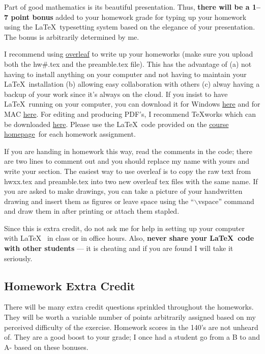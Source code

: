 \documentclass[12pt]{article}
\newcommand{\ingreen}[1]{\color{green}\textbf{#1} \color{black}}
\newcommand{\coursewebpage}{\href{https://github.com/kapelner/QC_Math_390.4_Spring_2020}{course homepage}}
\newcommand{\qu}[1]{``#1''}
\begin{document}
Part of good mathematics is its beautiful presentation. Thus, \ingreen{there will be a 1--7 point bonus} added to your homework grade  for typing up your homework using the \LaTeX ~typesetting system based on the elegance of your presentation. The bonus is arbitrarily determined by me.

I recommend using \href{http://overleaf.com}{overleaf} to write up your homeworks (make sure you upload both the hw\#.tex and the preamble.tex file). This has the advantage of (a) not having to install anything on your computer and not having to maintain your \LaTeX ~installation (b) allowing easy collaboration with others (c) alway having a backup of your work since it's always on the cloud. If you insist to have \LaTeX ~running on your computer, you can download it for Windows \href{http://www.miktex.org/download}{here} and for MAC \href{http://www.tug.org/mactex/}{here}. For editing and producing PDF's, I recommend \TeX works which can be downloaded \href{http://www.tug.org/texworks/#Getting_TeXworks}{here}. Please use the \LaTeX ~code provided on the \coursewebpage ~for each homework assignment. 

If you are handing in homework this way, read the comments in the code; there are two lines to comment out and you should replace my name with yours and write your section. The easiest way to use overleaf is to copy the raw text from hwxx.tex and preamble.tex into two new overleaf tex files with the same name. If you are asked to make drawings, you can take a picture of your handwritten drawing and insert them as figures or leave space using the \qu{$\backslash$vspace} command and draw them in after printing or attach them stapled.

Since this is extra credit, do not ask me for help in setting up your computer with \LaTeX~ in class or in office hours. Also, \textbf{never share your \LaTeX~code with other students} --- it is cheating and if you are found I will take it seriously.

\subsection*{Homework Extra Credit}

There will be many extra credit questions sprinkled throughout the homeworks. They will be worth a variable number of points arbitrarily assigned based on my perceived difficulty of the exercise. Homework scores in the 140's are not unheard of. They are a good boost to your grade; I once had a student go from a B to and A- based on these bonuses.
\end{document}
